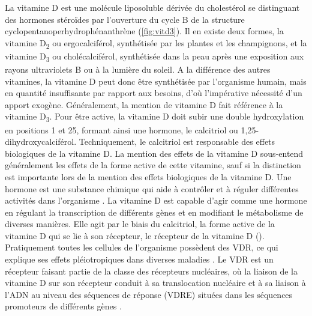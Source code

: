 \documentclass[
  a4paper,
  DIV=11,
  numbers=noendperiod,
  listof=totoc]{scrreprt}
\begin{document}
La vitamine D est une molécule liposoluble dérivée du cholestérol se
distinguant des hormones stéroïdes par l'ouverture du cycle B de la
structure cyclopentanoperhydrophénanthrène \autocite{Norman.2008}
(\cref{fig:vitd3}). Il en existe deux formes, la vitamine
D\textsubscript{2} ou ergocalciférol, synthétisée par les plantes et les
champignons, et la vitamine D\textsubscript{3} ou cholécalciférol,
synthétisée dans la peau après une exposition aux rayons ultraviolets B
ou à la lumière du soleil. A la différence des autres vitamines, la
vitamine D peut donc être synthétisée par l'organisme humain, mais en
quantité insuffisante par rapport aux besoins, d'où l'impérative
nécessité d'un apport exogène. Généralement, la mention de vitamine D
fait référence à la vitamine D\textsubscript{3}. Pour être active, la
vitamine D doit subir une double hydroxylation en positions 1 et 25,
formant ainsi une hormone, le calcitriol ou 1,25-dihydroxycalciférol.
Techniquement, le calcitriol est responsable des effets biologiques de
la vitamine D. La mention des effets de la vitamine D sous-entend
généralement les effets de la forme active de cette vitamine, sauf si la
distinction est importante lors de la mention des effets biologiques de
la vitamine D. Une hormone est une substance chimique qui aide à
contrôler et à réguler différentes activités dans l'organisme
\autocite{Ellison.2021}. La vitamine D est capable d'agir comme une
hormone en régulant la transcription de différents gènes et en modifiant
le métabolisme de diverses manières. Elle agit par le biais du
calcitriol, la forme active de la vitamine D qui se lie à son récepteur,
le récepteur de la vitamine D (). Pratiquement toutes les
cellules de l'organisme possèdent des \ac{VDR}, ce qui explique ses
effets pléiotropiques dans diverses maladies
\autocite{Ellison.2021,Caprio.2017,Norman.2008}. Le \ac{VDR} est un
récepteur faisant partie de la classe des récepteurs nucléaires, où la
liaison de la vitamine D sur son récepteur conduit à sa translocation
nucléaire et à sa liaison à l'ADN au niveau des séquences de réponse
(\acs{VDRE}) situées dans les séquences promoteurs de différents gènes
\autocite{Bouillon.2008}.
\end{document}
